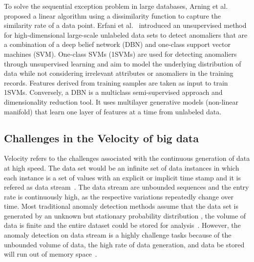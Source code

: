 To solve the sequential exception problem in large databases,
Arning et al.~\cite{arning1996linear} proposed a linear algorithm
using a dissimilarity function to capture the
similarity rate of a data point.
Erfani et al.~\cite{erfani2016high} introduced
an unsupervised method for high-dimensional large-scale
unlabeled data sets to detect anomaliers that
are a combination of a deep belief network (DBN) and one-class
support vector machines (SVM).
One-class SVMs (1SVMs) are used for detecting anomaliers
through unsupervised learning and aim to
model the underlying distribution of data while
not considering irrelevant attributes or
anomaliers in the training records.
Features derived from training samples are taken as input to train 1SVMs.
Conversely,
a DBN is
a multiclass semi-supervised approach and dimensionality reduction tool.
It uses multilayer
generative models (non-linear manifold) that learn one layer of features at a time
from unlabeled data.


\subsection{Challenges in the Velocity of big data}

Velocity refers to the challenges associated with
the continuous generation of data at
high speed.
The data set would be
an infinite set of data instances in which
each instance is a
set of values with an explicit or
implicit time stamp
and it is refered as data stream~\cite{sadik2014research}.
The data stream are unbounded
sequences and the entry rate is continuously high,
as the respective variations repeatedly
change over time.
Most traditional anomaly detection methods assume that
the data set is generated
by an unknown but stationary probability distribution
,
the volume of data is finite and
the entire dataset could be stored for analysis~\cite{silva2013data}.
However,
the anomaly detection on data stream is
a highly challenge tasks because of
the unbounded volume of data,
the high rate of data generation,
and data be stored will run out of memory space~\cite{sadik2014research}.


